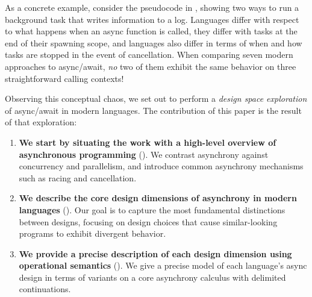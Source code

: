 As a concrete example, consider the pseudocode in , showing two ways to run a background task that writes information to a log.  Languages differ with respect to what happens when an async function is called, they differ with tasks at the end of their spawning scope, and languages also differ in terms of when and how tasks are stopped in the event of cancellation. When comparing seven modern approaches to async/await, \emph{no} two of them exhibit the same behavior on three straightforward calling contexts!

Observing this conceptual chaos, we set out to perform a \emph{design space exploration} of async/await in modern languages. The contribution of this paper is the result of that exploration:
\begin{enumerate}
  \item \textbf{We start by situating the work with a high-level overview of asynchronous programming} (). We contrast asynchrony against concurrency and parallelism, and introduce common asynchrony mechanisms such as racing and cancellation.

  \item \textbf{We describe the core design dimensions of asynchrony in modern languages} (). Our goal is to capture the most fundamental distinctions between designs, focusing on design choices that cause similar-looking programs to exhibit divergent behavior.

  \item \textbf{We provide a precise description of each design dimension using operational semantics} (). We give a precise model of each language's async design in terms of variants on a core asynchrony calculus with delimited continuations.
\end{enumerate}

